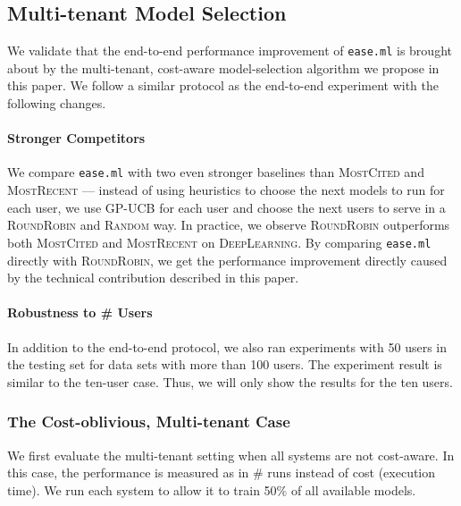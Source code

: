 \documentclass[letterpaper]{vldb}
\newcommand{\eml}{\texttt{ease.ml}\xspace}
\begin{document}
\subsection{Multi-tenant Model Selection}

We validate that the end-to-end performance
improvement of \eml is brought about by the
multi-tenant, cost-aware model-selection
algorithm we propose in this paper.
We follow a similar protocol as the
end-to-end experiment with the following changes.

\vspace{-0.5em}
\paragraph*{Stronger Competitors} We compare
\eml with two even stronger baselines
than \textsc{MostCited} and \textsc{MostRecent} ---
instead of using heuristics to choose the
next models to run for each user, we
use GP-UCB for each user and
choose the next users to serve 
in a \textsc{RoundRobin} 
and \textsc{Random} way. In practice,
we observe \textsc{RoundRobin} outperforms both 
\textsc{MostCited} and \textsc{MostRecent}
on \textsc{DeepLearning}.
By comparing \eml directly with
\textsc{RoundRobin}, we get the performance improvement directly caused by 
the technical contribution described in this paper.

\vspace{-0.5em}
\paragraph*{Robustness to \# Users}

In addition to the end-to-end
protocol, we also ran
experiments with 50 users
in the testing set for data sets
with more than 100 users. The experiment
result is similar to the ten-user case.
Thus, we will only show the
results for the ten users.

\vspace{-0.5em}
\subsubsection{The Cost-oblivious, Multi-tenant Case}

We first evaluate the multi-tenant setting
when all systems are not cost-aware. In this
case, the performance is measured as in
\# runs instead of cost (execution time).
We run each system to allow it to
train 50\% of all available models.

\vspace{-1em}
\end{document}
